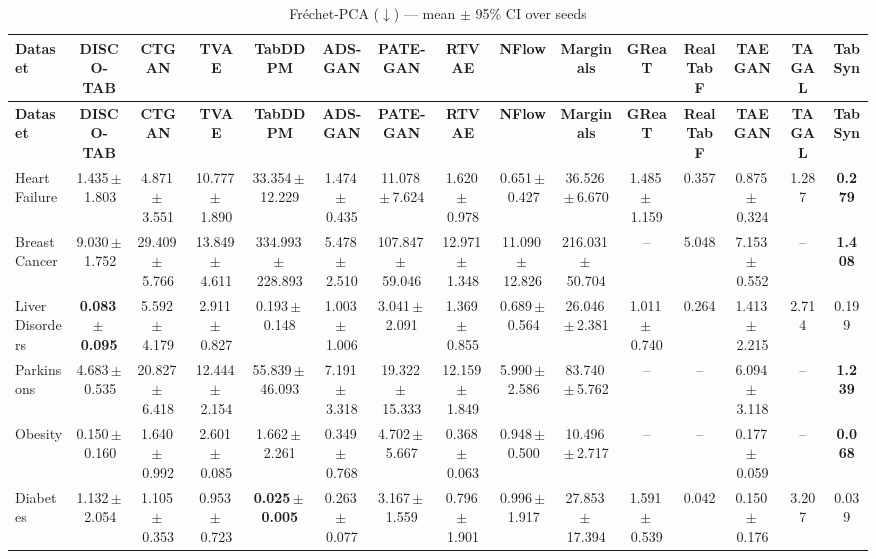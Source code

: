 \documentclass[8pt]{extarticle}
\begin{document}
\begin{longtable}{l*{14}{c}}
\caption{Fr\'echet-PCA ($\downarrow$) --- mean $\pm$ 95\% CI over seeds}\\
\toprule
\textbf{Dataset} & \textbf{DISCO-TAB} & \textbf{CTGAN} & \textbf{TVAE} & \textbf{TabDDPM} & \textbf{ADS-GAN} & \textbf{PATE-GAN} & \textbf{RTVAE} & \textbf{NFlow} & \textbf{Marginals} & \textbf{GReaT} & \textbf{RealTabF} & \textbf{TAEGAN} & \textbf{TAGAL} & \textbf{TabSyn} \\
\midrule
\endfirsthead
\toprule
\textbf{Dataset} & \textbf{DISCO-TAB} & \textbf{CTGAN} & \textbf{TVAE} & \textbf{TabDDPM} & \textbf{ADS-GAN} & \textbf{PATE-GAN} & \textbf{RTVAE} & \textbf{NFlow} & \textbf{Marginals} & \textbf{GReaT} & \textbf{RealTabF} & \textbf{TAEGAN} & \textbf{TAGAL} & \textbf{TabSyn} \\
\midrule
\endhead
\bottomrule
\endfoot
Heart Failure & 1.435\,$\pm$\,1.803 & 4.871\,$\pm$\,3.551 & 10.777\,$\pm$\,1.890 & 33.354\,$\pm$\,12.229 & 1.474\,$\pm$\,0.435 & 11.078\,$\pm$\,7.624 & 1.620\,$\pm$\,0.978 & 0.651\,$\pm$\,0.427 & 36.526\,$\pm$\,6.670 & 1.485\,$\pm$\,1.159 & 0.357 & 0.875\,$\pm$\,0.324 & 1.287 & \textbf{0.279} \\
Breast Cancer & 9.030\,$\pm$\,1.752 & 29.409\,$\pm$\,5.766 & 13.849\,$\pm$\,4.611 & 334.993\,$\pm$\,228.893 & 5.478\,$\pm$\,2.510 & 107.847\,$\pm$\,59.046 & 12.971\,$\pm$\,1.348 & 11.090\,$\pm$\,12.826 & 216.031\,$\pm$\,50.704 & -- & 5.048 & 7.153\,$\pm$\,0.552 & -- & \textbf{1.408} \\
Liver Disorders & \textbf{0.083\,$\pm$\,0.095} & 5.592\,$\pm$\,4.179 & 2.911\,$\pm$\,0.827 & 0.193\,$\pm$\,0.148 & 1.003\,$\pm$\,1.006 & 3.041\,$\pm$\,2.091 & 1.369\,$\pm$\,0.855 & 0.689\,$\pm$\,0.564 & 26.046\,$\pm$\,2.381 & 1.011\,$\pm$\,0.740 & 0.264 & 1.413\,$\pm$\,2.215 & 2.714 & 0.199 \\
Parkinsons & 4.683\,$\pm$\,0.535 & 20.827\,$\pm$\,6.418 & 12.444\,$\pm$\,2.154 & 55.839\,$\pm$\,46.093 & 7.191\,$\pm$\,3.318 & 19.322\,$\pm$\,15.333 & 12.159\,$\pm$\,1.849 & 5.990\,$\pm$\,2.586 & 83.740\,$\pm$\,5.762 & -- & -- & 6.094\,$\pm$\,3.118 & -- & \textbf{1.239} \\
Obesity & 0.150\,$\pm$\,0.160 & 1.640\,$\pm$\,0.992 & 2.601\,$\pm$\,0.085 & 1.662\,$\pm$\,2.261 & 0.349\,$\pm$\,0.768 & 4.702\,$\pm$\,5.667 & 0.368\,$\pm$\,0.063 & 0.948\,$\pm$\,0.500 & 10.496\,$\pm$\,2.717 & -- & -- & 0.177\,$\pm$\,0.059 & -- & \textbf{0.068} \\
Diabetes & 1.132\,$\pm$\,2.054 & 1.105\,$\pm$\,0.353 & 0.953\,$\pm$\,0.723 & \textbf{0.025\,$\pm$\,0.005} & 0.263\,$\pm$\,0.077 & 3.167\,$\pm$\,1.559 & 0.796\,$\pm$\,1.901 & 0.996\,$\pm$\,1.917 & 27.853\,$\pm$\,17.394 & 1.591\,$\pm$\,0.539 & 0.042 & 0.150\,$\pm$\,0.176 & 3.207 & 0.039 \\

\end{longtable}
\end{document}
